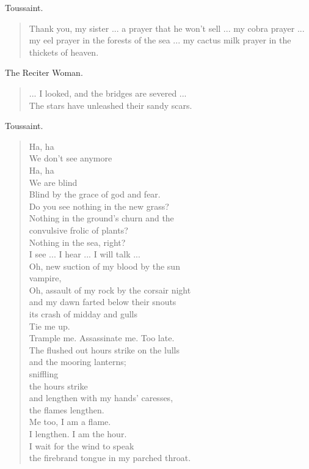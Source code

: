 \documentclass[letterpaper,article,12pt,oneside,notitlepage]{memoir}
\begin{document}
\begin{center}Toussaint.\end{center}

\begin{verse}
\indent Thank you, my sister ... a prayer that he won't sell ... my cobra prayer ... my eel prayer in the forests of the sea ... my cactus milk prayer in the thickets of heaven. \\
\end{verse}

\begin{center}The Reciter Woman.\end{center}

\begin{verse}
\hspace{1cm} ... I looked, and the bridges are severed ... \\
The stars have unleashed their sandy scars. \\
\end{verse}

\begin{center}Toussaint.\end{center}

\begin{verse}
Ha, ha \\
We don't see anymore \\
Ha, ha \\
We are blind \\
Blind by the grace of god and fear. \\
Do you see nothing in the new grass? \\
Nothing in the ground's churn and the \\
convulsive frolic of plants? \\
Nothing in the sea, right? \\
I see ... I hear ... I will talk ... \\
Oh, new suction of my blood by the sun \\
vampire, \\
Oh, assault of my rock by the corsair night \\
and my dawn farted below their snouts \\
its crash of midday and gulls \\
Tie me up. \\
Trample me. Assassinate me. Too late. \\
The flushed out hours strike on the lulls \\
and the mooring lanterns; \\
sniffling \\
the hours strike \\
and lengthen with my hands' caresses, \\
the flames lengthen. \\
Me too, I am a flame. \\
I lengthen. I am the hour. \\
I wait for the wind to speak \\
the firebrand tongue in my parched throat. \\
\end{verse}
\end{document}
